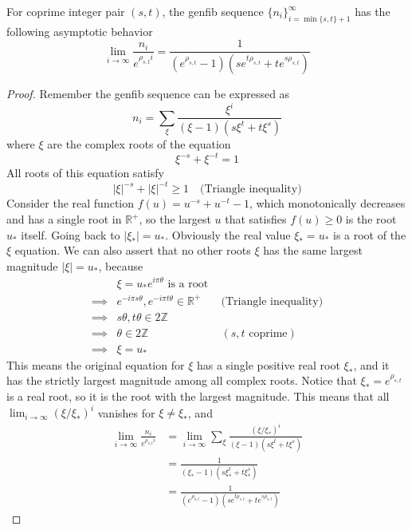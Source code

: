 \documentclass[]{article}
\begin{document}
\vspace{1cm}
\begin{lemma}
	For coprime integer pair $(s, t)$, the genfib sequence $\{n_i\}_{i=\min\{s,t\}+1}^{\infty}$ has the following asymptotic behavior
	\[
	\lim_{i\to\infty}    \frac{n_i}{e^{\rho_{s,t} i}} = \frac{1}{( e^{\rho_{s,t}} - 1)(s e^{t\rho_{s,t}} + t e^{s\rho_{s,t}})}
	\]
\end{lemma}
\begin{proof}
	Remember the genfib sequence can be expressed as 
	\[
	n_i = \sum_{\xi} \frac{\xi^i}{(\xi - 1)(s \xi^t + t \xi^s)}
	\]
	where $\xi$ are the complex roots of the equation
	\[
	\xi^{-s} + \xi^{-t} = 1
	\]
	All roots of this equation satisfy
	\[
	|\xi|^{-s} + |\xi|^{-t} \ge 1 \quad \text{(Triangle inequality)}
	\]
	Consider the real function $f(u) = u^{-s} + u^{-t} - 1$, which monotonically decreases and has a single root in $\mathbb{R}^+$, so the largest $u$ that satisfies $f(u)\ge 0$ is the root $u_*$ itself. Going back to $|\xi_*| = u_*$. Obviously the real value $\xi_* = u_*$ is a root of the $\xi$ equation. We can also assert that no other roots $\xi$ has the same largest magnitude  $|\xi| = u_*$, because
	\begin{align*}
	&\xi = u_*e^{i\pi\theta} \text{ is a root} \\
	\implies& e^{-i\pi s\theta}, e^{-i\pi t\theta} \in \mathbb{R}^+ \quad &\text{(Triangle inequality)} \\
	\implies& s\theta, t\theta \in 2\mathbb{Z} \\
	\implies& \theta \in 2\mathbb{Z} \quad &(s, t \text{ coprime})\\
	\implies& \xi = u_*
	\end{align*}
	This means the original equation for $\xi$ has a single positive real root $\xi_*$, and it has the strictly largest magnitude among all complex roots. Notice that $\xi_* = e^{\rho_{s,t}}$ is a real root, so it is the root with the largest magnitude. This means that all $\lim_{i\to\infty} (\xi/\xi_*)^i$ vanishes for $\xi\ne\xi_*$, and
	\begin{align*}
	\lim_{i\to\infty}    \frac{n_i}{e^{\rho_{s,t} i}} &= \lim_{i\to\infty} \sum_{\xi} \frac{(\xi / \xi_*)^i}{(\xi - 1)(s \xi^t + t \xi^s)} \\
	&=\frac{1}{(\xi_* - 1)(s \xi_*^t + t \xi_*^s)} \\
	&=\frac{1}{( e^{\rho_{s,t}} - 1)(s e^{t\rho_{s,t}} + t e^{s\rho_{s,t}})}
	\end{align*}

\end{proof}
\end{document}
